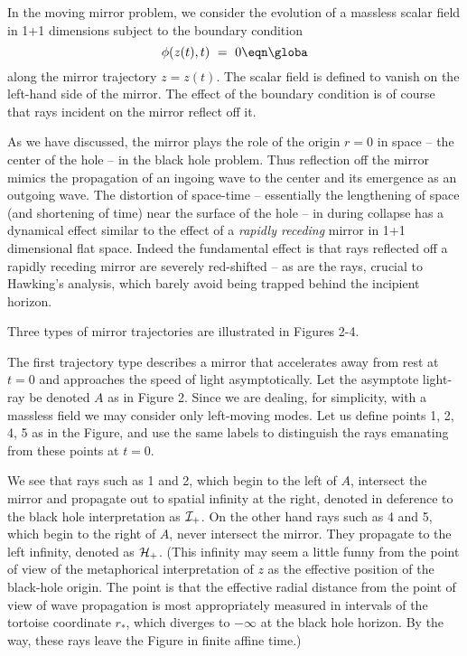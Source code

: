 In the moving mirror problem, we
consider the evolution of a massless scalar field
in 1+1 dimensions subject to the
boundary condition
$$
\phi (z(t), t) ~=~ 0
\eqn\globa
$$
along the mirror trajectory $z = z(t)$.
The scalar field is defined to vanish on the left-hand side of the
mirror.
The effect of the boundary condition is of course that rays incident
on the mirror reflect off it.



As we have discussed,
the mirror plays the role of the origin $r=0$ in
space -- the center of the hole -- in the black hole problem.
Thus reflection off the mirror mimics the propagation of an ingoing
wave to the center and its emergence as an outgoing wave.  The
distortion of space-time -- essentially the
lengthening of space (and shortening of time) near the surface of
the hole --
in during collapse has a dynamical effect similar
to
the
effect of a
{\it rapidly receding\/} mirror in 1+1 dimensional flat space.
Indeed the fundamental effect
is that rays reflected off a rapidly
receding mirror are severely red-shifted --
as are the rays, crucial to Hawking's analysis, which
barely avoid being trapped behind the incipient horizon.


Three types of mirror trajectories
are illustrated in Figures 2-4.


The first trajectory type describes a mirror
that accelerates away
from rest at
$t=0$ and approaches the speed of light asymptotically.
Let the asymptote light-ray be denoted $A$ as in Figure 2.
Since we
are dealing, for simplicity,
with a massless field we may consider only left-moving modes.  Let us
define points 1, 2, 4, 5 as in the Figure, and use the same labels to
distinguish
the rays emanating from these points
at $t=0$.

We see that rays such as 1 and 2, which begin to the left of $A$, intersect
the mirror and propagate out to spatial infinity at the right, denoted
in deference to the black hole interpretation as ${\cal I}_+$.  On the
other hand rays such as 4 and 5, which begin to the right of $A$, never
intersect the mirror.  They propagate to the left infinity, denoted as
${\cal H}_+$.  (This infinity may seem  a little funny from the
point of view of the
metaphorical interpretation of
$z$ as the effective position of the black-hole origin.  The point is
that the effective radial distance from the point of view of wave
propagation is most
appropriately measured in intervals of the tortoise coordinate
$r_*$, which diverges to $-\infty$ at the black hole horizon.
By the way, these rays leave the Figure in finite affine time.)

